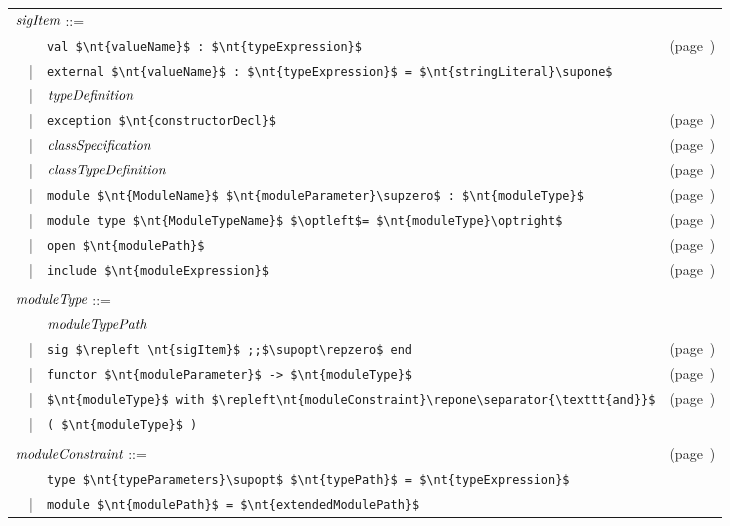 \begin{center}
\begin{tabular}{rcll}
\multicolumn{3}{l}{$\textit{\rmfamily sigItem}$ ::=}\\
&   & \hbox{\lstinline/val $\nt{valueName}$ : $\nt{typeExpression}$/} & (page~\pageref{keyword:val(signatures)})\\
& | & \hbox{\lstinline/external $\nt{valueName}$ : $\nt{typeExpression}$ = $\nt{stringLiteral}\supone$/}\\
& | & $\textit{\rmfamily typeDefinition}$\\
& | & \hbox{\lstinline/exception $\nt{constructorDecl}$/} & (page~\pageref{keyword:exception})\\
& | & $\textit{\rmfamily classSpecification}$ & (page~\pageref{classes:types})\\
& | & $\textit{\rmfamily classTypeDefinition}$ & (page~\pageref{classes:types})\\
& | & \hbox{\lstinline/module $\nt{ModuleName}$ $\nt{moduleParameter}\supzero$ : $\nt{moduleType}$/} & (page~\pageref{keyword:module})\\
& | & \hbox{\lstinline/module type $\nt{ModuleTypeName}$ $\optleft$= $\nt{moduleType}\optright$/} & (page~\pageref{keyword:sig})\\
& | & \hbox{\lstinline/open $\nt{modulePath}$/} & (page~\pageref{keyword:open})\\
& | & \hbox{\lstinline/include $\nt{moduleExpression}$/} & (page~\pageref{keyword:include})\\
\\
\multicolumn{3}{l}{$\textit{\rmfamily moduleType}$ ::=}\\
&   & $\textit{\rmfamily moduleTypePath}$\\
& | & \hbox{\lstinline/sig $\repleft \nt{sigItem}$ ;;$\supopt\repzero$ end/} & (page~\pageref{keyword:sig})\\
& | & \hbox{\lstinline/functor $\nt{moduleParameter}$ -> $\nt{moduleType}$/} & (page~\pageref{keyword:functor})\\
& | & \hbox{\lstinline/$\nt{moduleType}$ with $\repleft\nt{moduleConstraint}\repone\separator{\texttt{and}}$/} & (page~\pageref{section:sharing-constraints})\\
& | & \hbox{\lstinline/( $\nt{moduleType}$ )/}\\
\\
\multicolumn{3}{l}{$\textit{\rmfamily moduleConstraint}$ ::=} & (page~\pageref{section:sharing-constraints})\\
&   & \hbox{\lstinline/type $\nt{typeParameters}\supopt$ $\nt{typePath}$ = $\nt{typeExpression}$/}\\
& | & \hbox{\lstinline/module $\nt{modulePath}$ = $\nt{extendedModulePath}$/}
\end{tabular}
\end{center}

